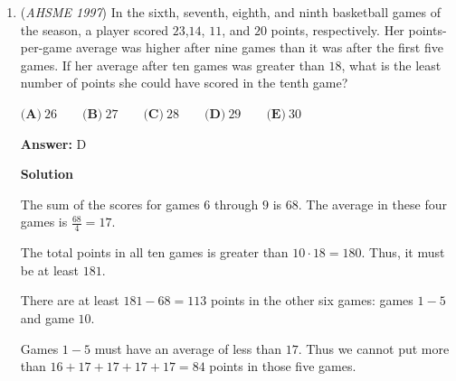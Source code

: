 \begin{enumerate}
 $\textbf{(A)}\ \frac{1}{3}\qquad\textbf{(B)}\ \frac{4}{9}\qquad\textbf{(C)}\ \frac{1}{2}\qquad\textbf{(D)}\ \frac{5}{9}\qquad\textbf{(E)}\ \frac{11}{18}$

 \textbf{Answer: }D



\textbf{Solution}

On the first die, the chance of an odd number is $\frac{4}{6} = \frac{2}{3}$, and the chance of an even number is $\frac{1}{3}$.

 On the second die, the chance of an odd number is $\frac{1}{3}$, and the chance of an even number is $\frac{2}{3}$.

 To get an odd sum, we need exactly one even and one odd.

 The odds of the first die being even and the second die being odd is $\frac{1}{3}\cdot\frac{1}{3} = \frac{1}{9}$

 The odds of the first die being odd and the second die being even is $\frac{2}{3}\cdot\frac{2}{3} = \frac{4}{9}$.

 The overall probability is $\frac{1}{9} + \frac{4}{9} = \frac{5}{9}$, and the answer is $\boxed{D}$.

 


	\item (\textit{AHSME 1997}) In the sixth, seventh, eighth, and ninth basketball games of the season, a player scored $23$,$14$, $11$, and $20$ points, respectively. Her points-per-game average was higher after nine games than it was after the first five games. If her average after ten games was greater than $18$, what is the least number of points she could have scored in the tenth game?


 $\textbf{(A)}\ 26\qquad\textbf{(B)}\ 27\qquad\textbf{(C)}\ 28\qquad\textbf{(D)}\ 29\qquad\textbf{(E)}\ 30$

 \textbf{Answer: }D



\textbf{Solution}

The sum of the scores for games $6$ through $9$ is $68$.  The average in these four games is $\frac{68}{4} = 17$.

 The total points in all ten games is greater than $10\cdot 18 = 180$.  Thus, it must be at least $181$.

 There are at least $181 - 68 = 113$ points in the other six games:  games $1-5$ and game $10$.

 Games $1-5$ must have an average of less than $17$.  Thus we cannot put more than $16 + 17 + 17 + 17 + 17 = 84$ points in those five games.


\end{enumerate}
